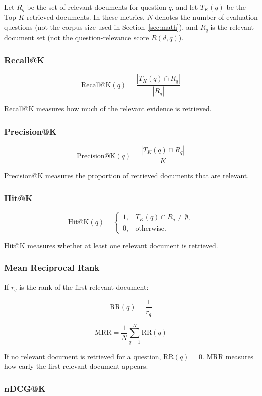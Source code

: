 \documentclass[12pt,a4paper]{report}
\begin{document}
Let $R_q$ be the set of relevant documents for question $q$, and let
$T_K(q)$ be the Top-$K$ retrieved documents. In these metrics, $N$ denotes the number of evaluation questions (not the corpus size used in Section~\ref{sec:math}), and $R_q$ is the relevant-document set (not the question-relevance score $R(d,q)$).

\subsubsection{Recall@K}

\[
\mathrm{Recall@K}(q)
=
\frac{|T_K(q)\cap R_q|}
{|R_q|}
\]

Recall@K measures how much of the relevant evidence is retrieved.

\subsubsection{Precision@K}

\[
\mathrm{Precision@K}(q)
=
\frac{|T_K(q)\cap R_q|}
{K}
\]

Precision@K measures the proportion of retrieved documents that are
relevant.

\subsubsection{Hit@K}

\[
\mathrm{Hit@K}(q)
=
\begin{cases}
1, & T_K(q)\cap R_q\neq\emptyset,\\
0, & \text{otherwise}.
\end{cases}
\]

Hit@K measures whether at least one relevant document is retrieved.

\subsubsection{Mean Reciprocal Rank}

If $r_q$ is the rank of the first relevant document:

\[
\mathrm{RR}(q)=\frac{1}{r_q}
\]

\[
\mathrm{MRR}
=
\frac{1}{N}
\sum_{q=1}^{N}
\mathrm{RR}(q)
\]

If no relevant document is retrieved for a question, $\mathrm{RR}(q)=0$. MRR measures how early the first relevant document appears.

\subsubsection{nDCG@K}
\end{document}
